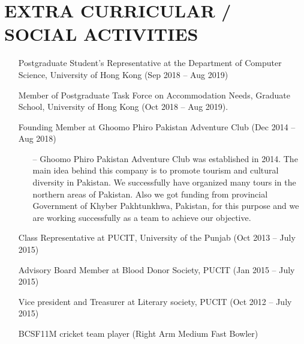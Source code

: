\section{EXTRA CURRICULAR / SOCIAL ACTIVITIES}

\begin{itemize}
    \item[\ding{118}] Postgraduate Student’s Representative at the Department of
    Computer Science, University of Hong Kong (Sep 2018 – Aug 2019)
    \item[\ding{118}] Member of Postgraduate Task Force on Accommodation Needs,
    Graduate School, University of Hong Kong (Oct 2018 – Aug 2019).
    \item[\ding{118}] Founding Member at Ghoomo Phiro Pakistan Adventure Club (Dec 2014 – Aug 2018)
    \begin{itemize}
        \item[--] Ghoomo Phiro Pakistan Adventure Club was established in 2014.
        The main idea behind this company is to promote tourism and cultural
        diversity in Pakistan. We successfully have organized many tours in the
        northern areas of Pakistan. Also we got funding from provincial Government
        of Khyber Pakhtunkhwa, Pakistan, for this purpose and we are working
        successfully as a team to achieve our objective.
    \end{itemize}
    \item[\ding{118}] Class Representative at PUCIT, University of the Punjab (Oct 2013 – July 2015)
    \item[\ding{118}] Advisory Board Member at Blood Donor Society, PUCIT (Jan 2015 – July 2015)
    \item[\ding{118}] Vice president and Treasurer at Literary society, PUCIT (Oct 2012 – July 2015)
    \item[\ding{118}] BCSF11M cricket team player (Right Arm Medium Fast Bowler)
\end{itemize}
